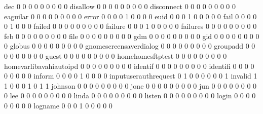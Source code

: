\documentclass[compress,8pt]{beamer}
\begin{document}
\begin{frame}
\begin{Schunk}
  dec                                        0   0   0   0   0   0   0   0   0
  disallow                                   0   0   0   0   0   0   0   0   0
  disconnect                                 0   0   0   0   0   0   0   0   0
  eaguilar                                   0   0   0   0   0   0   0   0   0
  error                                      0   0   0   0   1   0   0   0   0
  euid                                       0   0   0   1   0   0   0   0   0
  fail                                       0   0   0   0   0   1   0   0   0
  failed                                     0   0   0   0   0   0   0   0   0
  failure                                    0   0   0   1   0   0   0   0   0
  failures                                   0   0   0   0   0   0   0   0   0
  feb                                        0   0   0   0   0   0   0   0   0
  file                                       0   0   0   0   0   0   0   0   0
  gdm                                        0   0   0   0   0   0   0   0   0
  gid                                        0   0   0   0   0   0   0   0   0
  globus                                     0   0   0   0   0   0   0   0   0
  gnomescreensaverdialog                     0   0   0   0   0   0   0   0   0
  groupadd                                   0   0   0   0   0   0   0   0   0
  guest                                      0   0   0   0   0   0   0   0   0
  homehomesftptest                           0   0   0   0   0   0   0   0   0
  homevarlibavahiautoipd                     0   0   0   0   0   0   0   0   0
  identif                                    0   0   0   0   0   0   0   0   0
  identifi                                   0   0   0   0   0   0   0   0   0
  inform                                     0   0   0   0   1   0   0   0   0
  inputuserauthrequest                       0   1   0   0   0   0   0   0   1
  invalid                                    1   1   0   0   0   1   0   1   1
  johnson                                    0   0   0   0   0   0   0   0   0
  jone                                       0   0   0   0   0   0   0   0   0
  jun                                        0   0   0   0   0   0   0   0   0
  lee                                        0   0   0   0   0   0   0   0   0
  linda                                      0   0   0   0   0   0   0   0   0
  listen                                     0   0   0   0   0   0   0   0   0
  login                                      0   0   0   0   0   0   0   0   0
  logname                                    0   0   0   1   0   0   0   0   0

\end{Schunk}
\end{frame}
\end{document}
